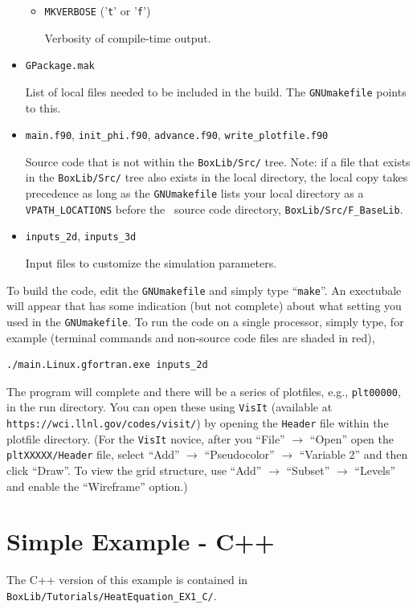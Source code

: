 \begin{itemize}
\begin{itemize}
    \item {\tt MKVERBOSE} ('{\tt t}' or '{\tt f}')

    Verbosity of compile-time output.

  \end{itemize}

\item {\tt GPackage.mak}

List of local files needed to be included in the build.  The {\tt GNUmakefile} points to this.

\item {\tt main.f90}, {\tt init\_phi.f90}, {\tt advance.f90}, {\tt write\_plotfile.f90}

Source code that is not within the {\tt BoxLib/Src/} tree.  Note: if a file that exists in the
{\tt BoxLib/Src/} tree also exists in the local directory, the local copy takes precedence
as long as the {\tt GNUmakefile} lists your local directory as a {\tt VPATH\_LOCATIONS} 
before the \BoxLib\ source code directory, {\tt BoxLib/Src/F\_BaseLib}.

\item {\tt inputs\_2d}, {\tt inputs\_3d}

Input files to customize the simulation parameters.

\end{itemize}

To build the code, edit the {\tt GNUmakefile} and simply type ``{\tt make}''.  An 
exectubale will appear that has some indication (but not complete)
about what setting you used in the {\tt GNUmakefile}.  To run the code on a single processor,
simply type, for example (terminal commands and non-source code files are shaded in red),
\begin{lstlisting}[backgroundcolor=\color{light-red}]
./main.Linux.gfortran.exe inputs_2d
\end{lstlisting}
The program will complete and there will be a series of plotfiles, e.g., {\tt plt00000}, in the run directory.
You can open these using {\tt VisIt} (available at {\tt https://wci.llnl.gov/codes/visit/}) by opening
the {\tt Header} file within the plotfile directory.  (For the {\tt VisIt} novice, after you 
``File'' $\rightarrow$ ``Open'' open the {\tt pltXXXXX/Header}
file, select ``Add'' $\rightarrow$ ``Pseudocolor'' $\rightarrow$ ``Variable 2'' and then click ``Draw''.  
To view the grid structure, use ``Add'' $\rightarrow$ ``Subset'' $\rightarrow$ ``Levels'' and enable
the ``Wireframe'' option.)

\section{Simple Example - C++}
The C++ version of this example is contained in {\tt BoxLib/Tutorials/HeatEquation\_EX1\_C/}.

